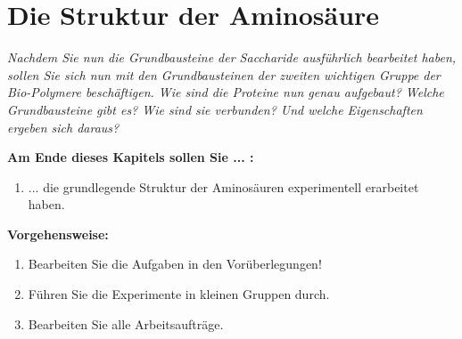 \documentclass{scrartcl}  %
\begin{document}
	\section{Die Struktur der Aminosäure}
	
		\textit{Nachdem Sie nun die Grundbausteine der Saccharide ausführlich bearbeitet haben, sollen Sie sich nun mit den Grundbausteinen der zweiten wichtigen Gruppe der Bio-Polymere beschäftigen. Wie sind die Proteine nun genau aufgebaut? Welche Grundbausteine gibt es? Wie sind sie verbunden? Und welche Eigenschaften ergeben sich daraus?} \newline
	
		\begin{minipage}{0.7\textwidth}
			\noindent \textbf{Am Ende dieses Kapitels sollen Sie ... :}
			\begin{enumerate}
				\item ... die grundlegende Struktur der Aminosäuren experimentell erarbeitet haben.
			\end{enumerate}
			\textbf{Vorgehensweise:}
			\begin{enumerate}
				\item Bearbeiten Sie die Aufgaben in den Vorüberlegungen!
				\item Führen Sie die Experimente in kleinen Gruppen durch.
				\item Bearbeiten Sie alle Arbeitsaufträge.
			\end{enumerate}
			
		\end{minipage}
		\hspace{0.1\textwidth}
\end{document}
